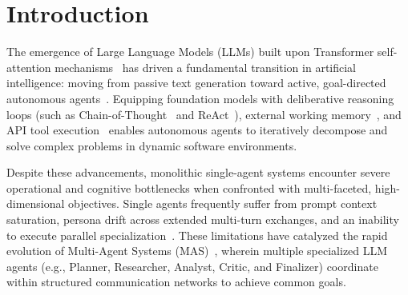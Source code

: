 \section{Introduction}
\label{sec:introduction}

The emergence of Large Language Models (LLMs) built upon Transformer self-attention mechanisms~\cite{Vaswani2017Attention,Devlin2019BERT,Brown2020Language} has driven a fundamental transition in artificial intelligence: moving from passive text generation toward active, goal-directed autonomous agents~\cite{Wang2024Survey,Xi2025Rise}. Equipping foundation models with deliberative reasoning loops (such as Chain-of-Thought~\cite{Wei2022Chain} and ReAct~\cite{Yao2023ReAct}), external working memory~\cite{Park2023Generative,Sumers2024Cognitive}, and API tool execution~\cite{Schick2023Toolformer,Qin2024ToolLLM,Patil2024Gorilla} enables autonomous agents to iteratively decompose and solve complex problems in dynamic software environments.

Despite these advancements, monolithic single-agent systems encounter severe operational and cognitive bottlenecks when confronted with multi-faceted, high-dimensional objectives. Single agents frequently suffer from prompt context saturation, persona drift across extended multi-turn exchanges, and an inability to execute parallel specialization~\cite{Wu2024AutoGen,Li2023CAMEL}. These limitations have catalyzed the rapid evolution of Multi-Agent Systems (MAS)~\cite{Hong2024MetaGPT,Chen2024AgentVerse,Qian2024Communicative}, wherein multiple specialized LLM agents (e.g., Planner, Researcher, Analyst, Critic, and Finalizer) coordinate within structured communication networks to achieve common goals.

